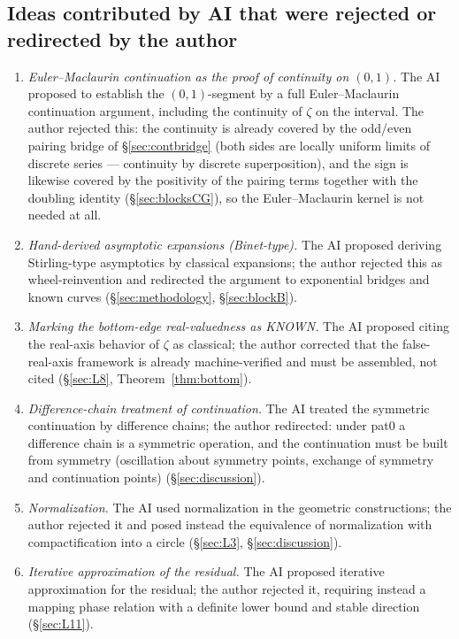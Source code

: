 \documentclass{article}
\newcommand{\zt}{\zeta}
\begin{document}
\subsection*{Ideas contributed by AI that were rejected or redirected by the author}
\begin{enumerate}
\item \emph{Euler--Maclaurin continuation as the proof of continuity on
$(0,1)$.} The AI proposed to establish the $(0,1)$-segment by a full
Euler--Maclaurin continuation argument, including the continuity of $\zt$ on
the interval. The author rejected this: the continuity is already covered by
the odd/even pairing bridge of \S\ref{sec:contbridge} (both sides are
locally uniform limits of discrete series --- continuity by discrete
superposition), and the sign is likewise covered by the positivity of the
pairing terms together with the doubling identity
(\S\ref{sec:blocksCG}), so the Euler--Maclaurin kernel is not needed at all.
\item \emph{Hand-derived asymptotic expansions (Binet-type).} The AI
proposed deriving Stirling-type asymptotics by classical expansions; the
author rejected this as wheel-reinvention and redirected the argument to
exponential bridges and known curves (\S\ref{sec:methodology},
\S\ref{sec:blockB}).
\item \emph{Marking the bottom-edge real-valuedness as KNOWN.} The AI
proposed citing the real-axis behavior of $\zt$ as classical; the author
corrected that the false-real-axis framework is already machine-verified and
must be assembled, not cited (\S\ref{sec:L8}, Theorem~\ref{thm:bottom}).
\item \emph{Difference-chain treatment of continuation.} The AI treated the
symmetric continuation by difference chains; the author redirected: under
pat0 a difference chain is a symmetric operation, and the continuation must
be built from symmetry (oscillation about symmetry points, exchange of
symmetry and continuation points) (\S\ref{sec:discussion}).
\item \emph{Normalization.} The AI used normalization in the geometric
constructions; the author rejected it and posed instead the equivalence of
normalization with compactification into a circle (\S\ref{sec:L3},
\S\ref{sec:discussion}).
\item \emph{Iterative approximation of the residual.} The AI proposed
iterative approximation for the residual; the author rejected it, requiring
instead a mapping phase relation with a definite lower bound and stable
direction (\S\ref{sec:L11}).

\end{enumerate}
\end{document}
